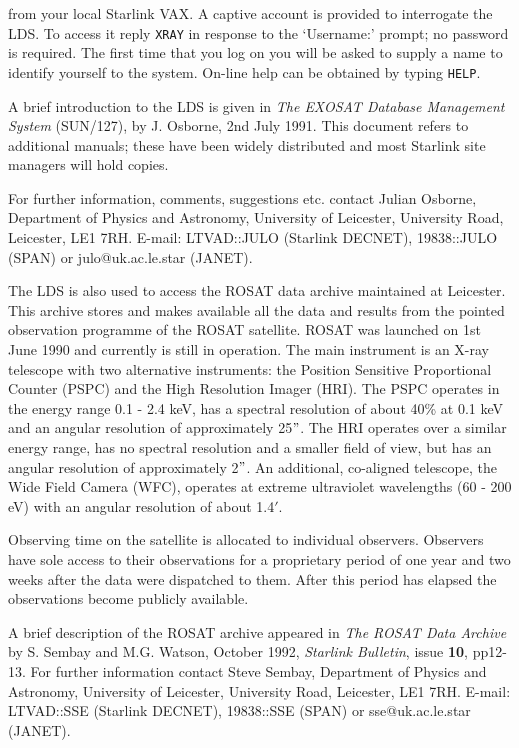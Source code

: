\documentclass[twoside,11pt]{article}
\newcommand{\xref}[3]{#1}
\begin{document}
from your local Starlink VAX. A captive account is provided to
interrogate the LDS. To access it reply \verb-XRAY- in response to the
`Username:' prompt; no password is required. The first time that you log
on you will be asked to supply a name to identify yourself to the
system. On-line help can be obtained by typing \verb-HELP-.

A brief introduction to the LDS is given in {\it The EXOSAT Database
Management System}
\newline
(\xref{SUN/127}{sun127}{}), by J. Osborne, 2nd July 1991. This document refers
to additional manuals; these have been widely distributed and most
Starlink site managers will hold copies.

For further information, comments, suggestions etc. contact Julian
Osborne, Department of Physics and Astronomy, University of Leicester,
University Road, Leicester, LE1 7RH. E-mail: LTVAD::JULO (Starlink
DECNET), 19838::JULO (SPAN) or julo@uk.ac.le.star (JANET).

The LDS is also used to access the ROSAT data archive maintained at
Leicester. This archive stores and makes available all the data and
results from the pointed observation programme of the ROSAT satellite.
ROSAT was launched on 1st June 1990 and currently is still in operation.
The main instrument is an X-ray telescope with two alternative
instruments: the Position Sensitive Proportional Counter (PSPC) and the
High Resolution Imager (HRI). The PSPC operates in the energy range
0.1 - 2.4 keV, has a spectral resolution of about 40\% at 0.1 keV and an
angular resolution of approximately 25$"$. The HRI operates over a
similar energy range, has no spectral resolution and a smaller field of
view, but has an angular resolution of approximately 2$"$. An
additional, co-aligned telescope, the Wide Field Camera (WFC), operates
at extreme ultraviolet wavelengths (60 - 200 eV) with an angular
resolution of about 1.4$'$.

Observing time on the satellite is allocated to individual observers.
Observers have sole access to their observations for a proprietary
period of one year and two weeks after the data were dispatched to them.
After this period has elapsed the observations become publicly
available.

A brief description of the ROSAT archive appeared in {\it The ROSAT
Data Archive} by S. Sembay and M.G. Watson, October 1992, {\it
Starlink Bulletin}, issue {\bf 10}, pp12-13. For further information
contact Steve Sembay, Department of Physics and Astronomy, University
of Leicester, University Road, Leicester, LE1 7RH. E-mail: LTVAD::SSE
(Starlink DECNET), 19838::SSE (SPAN) or sse@uk.ac.le.star (JANET).
\end{document}
